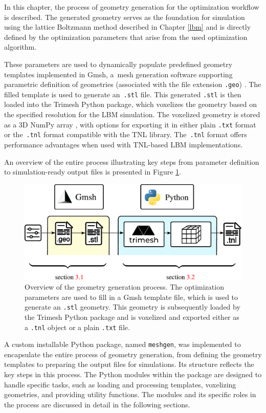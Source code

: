 In this chapter, the process of geometry generation for the optimization workflow is described. The generated geometry serves as the foundation for simulation using the lattice Boltzmann method described in Chapter \ref{lbm} and is directly defined by the optimization parameters that arise from the used optimization algorithm. 

These parameters are used to dynamically populate predefined geometry templates implemented in Gmsh, a~mesh generation software supporting parametric definition of geometries (associated with the file extension \texttt{.geo}) \cite{gmsh}. The filled template is used to generate an~\texttt{.stl} file. This generated \texttt{.stl} is then loaded into the Trimesh \cite{trimesh} Python package, which voxelizes the geometry based on the specified resolution for the LBM simulation. The voxelized geometry is stored as a 3D NumPy array \cite{numpy}, with options for exporting it in either plain \texttt{.txt} format or the~\texttt{.tnl} format compatible with the TNL library. The~\texttt{.tnl} format offers performance advantages when used with TNL-based LBM implementations.

An overview of the entire process illustrating key steps from parameter definition to simulation-ready output files is presented in Figure \ref{fig:meshgen overview}.


\begin{figure}[H]
	\centering
	\includegraphics[width=.92\textwidth]{figures/meshgen.pdf}
	\caption{Overview of the geometry generation process. The optimization parameters are used to fill in a Gmsh  template file, which is used to generate an \texttt{.stl} geometry. This geometry is subsequently loaded by the Trimesh Python package and is voxelized and exported either as a \texttt{.tnl} object or a plain \texttt{.txt} file.}
	\label{fig:meshgen overview}
\end{figure}

A custom installable Python package, named \texttt{meshgen}, was implemented to encapsulate the entire process of geometry generation, from defining the geometry templates to preparing the output files for simulations. Its structure reflects the key steps in this process. The Python modules within the package are designed to handle specific tasks, such as loading and processing templates, voxelizing geometries, and providing utility functions. The modules and its specific roles in the process are discussed in detail in the following sections.

